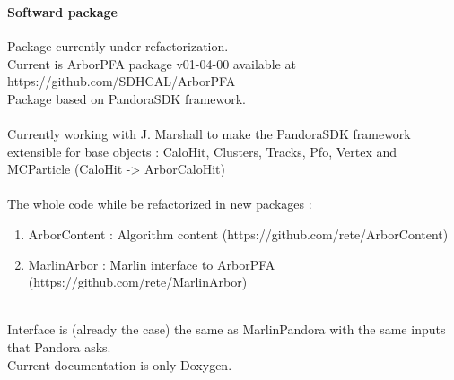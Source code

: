 \documentclass[8pt]{beamer}
\begin{document}
  \begin{frame}
  \frametitle{\secname}
  \framesubtitle{Softward package}
  
  Package currently under refactorization. \\ 
  Current is ArborPFA package v01-04-00 available at https://github.com/SDHCAL/ArborPFA \\
  Package based on PandoraSDK framework. \\
  ~ \\
  Currently working with J. Marshall to make the PandoraSDK framework extensible for base objects : CaloHit, Clusters, Tracks, Pfo, Vertex and MCParticle (CaloHit -> ArborCaloHit) \\
  ~ \\
  The whole code while be refactorized in new packages : \\
  \begin{enumerate}
    \item ArborContent : Algorithm content (https://github.com/rete/ArborContent)
    \item MarlinArbor : Marlin interface to ArborPFA (https://github.com/rete/MarlinArbor)
  \end{enumerate}
  ~ \\
  Interface is (already the case) the same as MarlinPandora with the same inputs that Pandora asks. \\
  Current documentation is only Doxygen.
  
  \end{frame}
  
\end{document}
